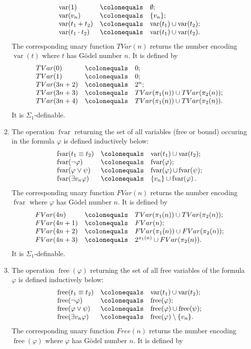 \documentclass[leqno]{report}
\newcommand{\var}[1]{\mathop{\mathrm{var}}(#1)}
\newcommand{\free}[1]{\mathop{\mathrm{free}}(#1)}
\newcommand{\fvar}[1]{\mathop{\mathrm{fvar}(#1)}}
\begin{document}
\begin{enumerate}[1.]
\[\begin{array}{lll}
\var{1} & \colonequals & \emptyset;\cr
\var{v_n} & \colonequals & \{ v_n \};\cr
\var{t_1 + t_2} & \colonequals & \var{t_1} \cup \var{t_2};\cr
\var{t_1 \cdot t_2} & \colonequals & \var{t_1} \cup \var{t_2}.
\end{array}
\]
The corresponding unary function $TVar(n)$ returns the number encoding $\var{t}$ where $t$ has G\"{o}del number $n$. It is defined by
\[
\begin{array}{lll}
TVar(0) & \colonequals & 0;\cr
TVar(1) & \colonequals & 0;\cr
TVar(3n + 2) & \colonequals & 2^n;\cr
TVar(3n + 3) & \colonequals & TVar(\pi_1 (n)) \cup TVar(\pi_2 (n));\cr
TVar(3n + 4) & \colonequals & TVar(\pi_1 (n)) \cup TVar(\pi_2 (n)).
\end{array}
\]
It is $\Sigma_1$-definable.
%
\item The operation $\fvar{\varphi}$ returning the set of all variables (free or bound) occuring in the formula $\varphi$ is defined inductively below:
\[
\begin{array}{lll}
\fvar{t_1 \equiv t_2} & \colonequals & \var{t_1} \cup \var{t_2};\cr
\fvar{\neg\varphi} & \colonequals & \fvar{\varphi};\cr
\fvar{\varphi \lor \psi} & \colonequals & \fvar{\varphi} \cup \fvar{\psi};\cr
\fvar{\exists v_n \varphi} & \colonequals & \{ v_n \} \cup \fvar{\varphi}.
\end{array}
\]
The corresponding unary function $FVar(n)$ returns the number encoding $\fvar{\varphi}$ where $\varphi$ has G\"{o}del number $n$. It is defined by
\[
\begin{array}{lll}
FVar(4n) & \colonequals & TVar(\pi_1 (n)) \cup TVar(\pi_2 (n));\cr
FVar(4n + 1) & \colonequals & FVar(n);\cr
FVar(4n + 2) & \colonequals & FVar(\pi_1 (n)) \cup FVar(\pi_2 (n));\cr
FVar(4n + 3) & \colonequals & 2^{\pi_1 (n)} \cup FVar(\pi_2 (n)).
\end{array}
\]
It is $\Sigma_1$-definable.
%
\item The operation $\free{\varphi}$ returning the set of all free variables of the formula $\varphi$ is defined inductively below:
\[
\begin{array}{lll}
\free{t_1 \equiv t_2} & \colonequals & \var{t_1} \cup \var{t_2};\cr
\free{\neg\varphi} & \colonequals & \free{\varphi};\cr
\free{\varphi\lor\psi} & \colonequals & \free{\varphi} \cup \free{\psi};\cr
\free{\exists v_n \varphi} & \colonequals & \free{\varphi} \setminus \{ v_n \}.
\end{array}
\]
The corresponding unary function $Free(n)$ returns the number encoding $\free{\varphi}$ where $\varphi$ has G\"{o}del number $n$. It is defined by

\end{enumerate}
\end{document}
